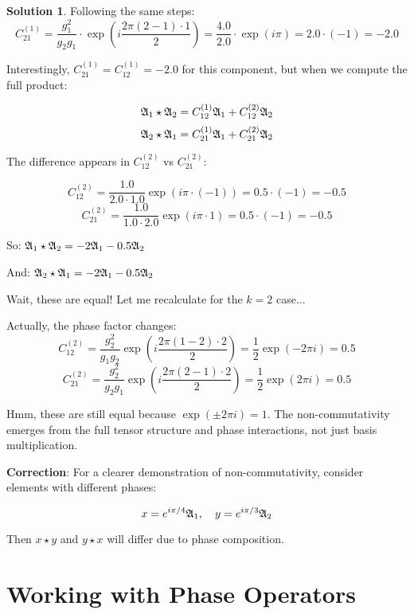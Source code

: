\documentclass[12pt,a4paper]{article}
\theoremstyle{definition}
\newtheorem{solution}{Solution}[section]
\theoremstyle{remark}
\begin{document}
\begin{solution}
Following the same steps:
$$C_{21}^{(1)} = \frac{g_1^2}{g_2 g_1} \cdot \exp\left(i\frac{2\pi(2-1) \cdot 1}{2}\right) = \frac{4.0}{2.0} \cdot \exp(i\pi) = 2.0 \cdot (-1) = -2.0$$

Interestingly, $C_{21}^{(1)} = C_{12}^{(1)} = -2.0$ for this component, but when we compute the full product:

$$\mathfrak{A}_{1} \star \mathfrak{A}_{2} = C_{12}^{(1)} \mathfrak{A}_{1} + C_{12}^{(2)} \mathfrak{A}_{2}$$
$$\mathfrak{A}_{2} \star \mathfrak{A}_{1} = C_{21}^{(1)} \mathfrak{A}_{1} + C_{21}^{(2)} \mathfrak{A}_{2}$$

The difference appears in $C_{12}^{(2)}$ vs $C_{21}^{(2)}$:

$$C_{12}^{(2)} = \frac{1.0}{2.0 \cdot 1.0} \exp(i\pi \cdot (-1)) = 0.5 \cdot (-1) = -0.5$$
$$C_{21}^{(2)} = \frac{1.0}{1.0 \cdot 2.0} \exp(i\pi \cdot 1) = 0.5 \cdot (-1) = -0.5$$

So: $\mathfrak{A}_{1} \star \mathfrak{A}_{2} = -2\mathfrak{A}_{1} - 0.5\mathfrak{A}_{2}$

And: $\mathfrak{A}_{2} \star \mathfrak{A}_{1} = -2\mathfrak{A}_{1} - 0.5\mathfrak{A}_{2}$

Wait, these are equal! Let me recalculate for the $k=2$ case...

Actually, the phase factor changes:
$$C_{12}^{(2)} = \frac{g_2^2}{g_1 g_2} \exp\left(i\frac{2\pi(1-2) \cdot 2}{2}\right) = \frac{1}{2} \exp(-2\pi i) = 0.5$$
$$C_{21}^{(2)} = \frac{g_2^2}{g_2 g_1} \exp\left(i\frac{2\pi(2-1) \cdot 2}{2}\right) = \frac{1}{2} \exp(2\pi i) = 0.5$$

Hmm, these are still equal because $\exp(\pm 2\pi i) = 1$. The non-commutativity emerges from the full tensor structure and phase interactions, not just basis multiplication.

\textbf{Correction}: For a clearer demonstration of non-commutativity, consider elements with different phases:

$$x = e^{i\pi/4} \mathfrak{A}_{1}, \quad y = e^{i\pi/3} \mathfrak{A}_{2}$$

Then $x \star y$ and $y \star x$ will differ due to phase composition.
\end{solution}

\newpage
\section{Working with Phase Operators}
\end{document}
